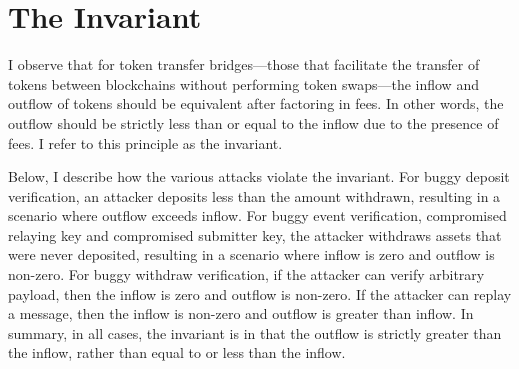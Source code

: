\section{The Invariant}
I observe that for token transfer bridges—those that facilitate the transfer of tokens between blockchains without performing token swaps—the inflow and outflow of tokens should be equivalent after factoring in fees. In other words, the outflow should be strictly less than or equal to the inflow due to the presence of fees. I refer to this principle as the invariant.


Below, I describe how the various attacks violate the invariant. For buggy deposit verification, an attacker deposits less than the amount withdrawn, resulting in a scenario where outflow exceeds inflow. For buggy event verification, compromised relaying key and compromised submitter key, the attacker withdraws assets that were never deposited, resulting in a scenario where inflow is zero and outflow is non-zero. For buggy withdraw verification, if the attacker can verify arbitrary payload, then the inflow is zero and outflow is non-zero. If the attacker can replay a message, then the inflow is non-zero and outflow is greater than inflow. In summary, in all cases, the invariant is in that the outflow is strictly greater than the inflow, rather than equal to or less than the inflow.


